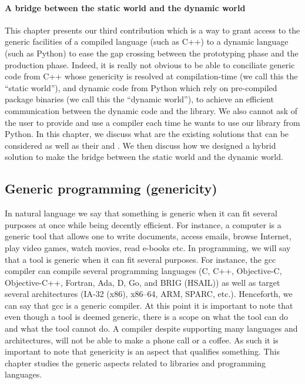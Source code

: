 \paragraph{A bridge between the static world and the dynamic world} This chapter presents our third contribution which
is a way to grant access to the generic facilities of a compiled language (such as C++) to a dynamic language (such as
Python) to ease the gap crossing between the prototyping phase and the production phase. Indeed, it is really not
obvious to be able to conciliate generic code from C++ whose genericity is resolved at compilation-time (we call this
the ``static world''), and dynamic code from Python which rely on pre-compiled package binaries (we call this the
``dynamic world''), to achieve an efficient communication between the dynamic code and the library. We also cannot ask
of the user to provide and use a compiler each time he wants to use our library from Python. In this chapter, we discuss
what are the existing solutions that can be considered as well as their \pros and \cons. We then discuss how we designed
a hybrid solution to make the bridge between the static world and the dynamic world.


\subsection*{Generic programming (genericity)}


In natural language we say that something is generic when it can fit several purposes at once while being decently
efficient. For instance, a computer is a generic tool that allows one to write documents, access emails, browse
Internet, play video games, watch movies, read e-books etc. In programming, we will say that a tool is generic when it
can fit several purposes. For instance, the gcc compiler can compile several programming languages (C, C++, Objective-C,
Objective-C++, Fortran, Ada, D, Go, and BRIG (HSAIL)) as well as target several architectures (IA-32 (x86), x86--64,
ARM, SPARC, etc.). Henceforth, we can say that gcc is a generic compiler. At this point it is important to note that
even though a tool is deemed generic, there is a scope on what the tool can do and what the tool cannot do. A compiler
despite supporting many languages and architectures, will not be able to make a phone call or a coffee. As such it is
important to note that genericity is an aspect that qualifies something. This chapter studies the generic aspects
related to libraries and programming languages.

